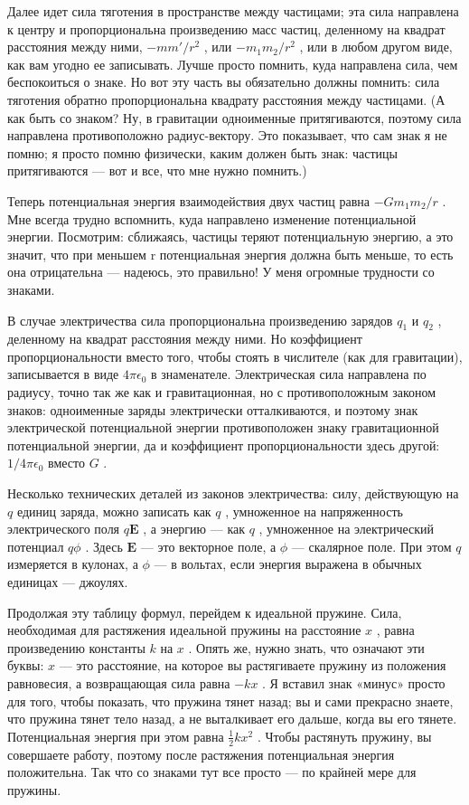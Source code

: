 \documentclass[11pt,oneside]{article}
\providecommand{\FLPE}{\mathbf{E}}
\begin{document}
Далее идет сила тяготения в пространстве между частицами; эта сила направлена к центру и пропорциональна произведению масс частиц, деленному на квадрат расстояния между ними, \(-mm'/r^2\) , или \(-m_1m_2/r^2\) , или в любом другом виде, как вам угодно ее записывать. Лучше просто помнить, куда направлена сила, чем беспокоиться о знаке. Но вот эту часть вы обязательно должны помнить: сила тяготения обратно пропорциональна квадрату расстояния между частицами. (А как быть со знаком? Ну, в гравитации одноименные притягиваются, поэтому сила направлена противоположно радиус-вектору. Это показывает, что сам знак я не помню; я просто помню физически, каким должен быть знак: частицы притягиваются --- вот и все, что мне нужно помнить.)\par

Теперь потенциальная энергия взаимодействия двух частиц равна \(-Gm_1m_2/r\) . Мне всегда трудно вспомнить, куда направлено изменение потенциальной энергии. Посмотрим: сближаясь, частицы теряют потенциальную энергию, а это значит, что при меньшем r потенциальная энергия должна быть меньше, то есть она отрицательна --- надеюсь, это правильно! У меня огромные трудности со знаками.\par

В случае электричества сила пропорциональна произведению зарядов \(q_1\) и \(q_2\) , деленному на квадрат расстояния между ними. Но коэффициент пропорциональности вместо того, чтобы стоять в числителе (как для гравитации), записывается в виде \(4\pi\epsilon_0\) в знаменателе. Электрическая сила направлена по радиусу, точно так же как и гравитационная, но с противоположным законом знаков: одноименные заряды электрически отталкиваются, и поэтому знак электрической потенциальной энергии противоположен знаку гравитационной потенциальной энергии, да и коэффициент пропорциональности здесь другой: \(1/4\pi\epsilon_0\) вместо \(G\) .\par

Несколько технических деталей из законов электричества: силу, действующую на \(q\) единиц заряда, можно записать как \(q\) , умноженное на напряженность электрического поля \(q\FLPE\) , а энергию --- как \(q\) , умноженное на электрический потенциал \(q\phi\) . Здесь \(\FLPE\) --- это векторное поле, а \(\phi\) --- скалярное поле. При этом \(q\) измеряется в кулонах, а \(\phi\) --- в вольтах, если энергия выражена в обычных единицах --- джоулях.\par

Продолжая эту таблицу формул, перейдем к идеальной пружине. Сила, необходимая для растяжения идеальной пружины на расстояние \(x\) , равна произведению константы \(k\) на \(x\) . Опять же, нужно знать, что означают эти буквы: \(x\) --- это расстояние, на которое вы растягиваете пружину из положения равновесия, а возвращающая сила равна \(-kx\) . Я вставил знак «минус» просто для того, чтобы показать, что пружина тянет назад; вы и сами прекрасно знаете, что пружина тянет тело назад, а не выталкивает его дальше, когда вы его тянете. Потенциальная энергия при этом равна \(\frac12kx^2\) . Чтобы растянуть пружину, вы совершаете работу, поэтому после растяжения потенциальная энергия положительна. Так что со знаками тут все просто --- по крайней мере для пружины.\par
\end{document}
